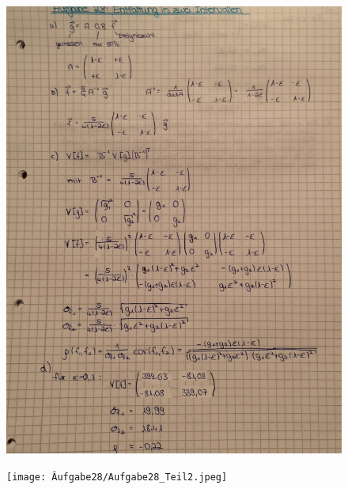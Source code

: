 \begin{figure}[H]
  \centering
  \includegraphics[width=\textwidth]{Aufgabe28/Aufgabe28_Teil1.jpeg}
\end{figure}

\begin{figure}[H]
  \centering
  \texttt{[image: Âufgabe28/Aufgabe28\_Teil2.jpeg]}
\end{figure}
